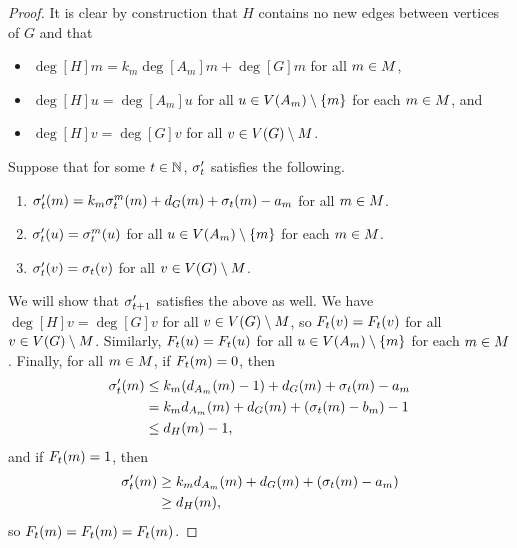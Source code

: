 \begin{proof}
It is clear by construction that $H$ contains no new edges between vertices of
$G$ and that
\begin{itemize}
\item $\deg[H]{m} = k_m\deg[{A_m}]{m} + \deg[G]{m}$ for all $m \in \mots$,
\item $\deg[H]{u} = \deg[{A_m}]{u}$ for all $u \in \V[A_m] \setminus \{m\}$ for
  each $m \in \mots$, and
\item $\deg[H]{v} = \deg[G]{v}$ for all $v \in \V \setminus \mots$.
\end{itemize}
Suppose that for some $t \in \nats$, $\pos[\s']{t}$ satisfies the following.
\begin{enumerate} \label{posAtT}
\item $\chips[\s']{m}{t} = k_m\chips[\s^m]{m}{t} + \deg[G]{m} + \chips{m}{t} -
  a_m$ for all $m \in \mots$.
\item $\chips[\s']{u}{t} = \chips[\s^m]{u}{t}$ for all $u \in \V[A_m] \setminus
  \{m\}$ for each $m \in \mots$.
\item $\chips[\s']{v}{t} = \chips{v}{t}$ for all $v \in \V \setminus \mots$.
\end{enumerate}
We will show that $\pos[\s']{t+1}$ satisfies the above as well. We have
$\deg[H]{v} = \deg[G]{v}$ for all $v \in \V \setminus \mots$, so
$\firing[\s']{v}{t} = \firing{v}{t}$ for all $v \in \V \setminus
\mots$. Similarly, $\firing[\s']{u}{t} = \firing[\s^m]{u}{t}$ for all $u \in
\V[A_m] \setminus \{m\}$ for each $m \in \mots$. Finally, for all $m \in
\mots$, if $\firing[\s^m]{m}{t} = 0$, then
\begin{align*}
  \chips[\s']{m}{t} &\leq k_m(\deg[{A_m}]{m)-1} + \deg[G]{m} + \chips{m}{t} -
  a_m \\
  &= k_m\deg[{A_m}]{m} + \deg[G]{m} + (\chips{m}{t} - b_m) - 1 \\
  &\leq \deg[H]{m} - 1,
\end{align*}
and if $\firing[\s^m]{m}{t} = 1$, then
\begin{align*}
  \chips[\s']{m}{t} &\geq k_m\deg[{A_m}]{m} + \deg[G]{m} + (\chips{m}{t} - a_m)
  \\
  &\geq \deg[H]{m},
\end{align*}
so $\firing[\s']{m}{t} = \firing[\s^m]{m}{t} = \firing{m}{t}$.


\end{proof}
